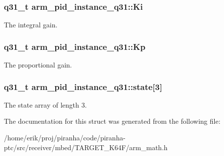 \subsubsection[{\texorpdfstring{Ki}{Ki}}]{\setlength{\rightskip}{0pt plus 5cm}q31\+\_\+t arm\+\_\+pid\+\_\+instance\+\_\+q31\+::\+Ki}\hypertarget{structarm__pid__instance__q31_aa861d69fd398f29aa0b4b455a823ed72}{}\label{structarm__pid__instance__q31_aa861d69fd398f29aa0b4b455a823ed72}
The integral gain. 
\subsubsection[{\texorpdfstring{Kp}{Kp}}]{\setlength{\rightskip}{0pt plus 5cm}q31\+\_\+t arm\+\_\+pid\+\_\+instance\+\_\+q31\+::\+Kp}\hypertarget{structarm__pid__instance__q31_ac2410bf7f856d58dc1d773d4983cac8e}{}\label{structarm__pid__instance__q31_ac2410bf7f856d58dc1d773d4983cac8e}
The proportional gain. 
\subsubsection[{\texorpdfstring{state}{state}}]{\setlength{\rightskip}{0pt plus 5cm}q31\+\_\+t arm\+\_\+pid\+\_\+instance\+\_\+q31\+::state\mbox{[}3\mbox{]}}\hypertarget{structarm__pid__instance__q31_a228e4a64da6014844a0a671a1fa391d4}{}\label{structarm__pid__instance__q31_a228e4a64da6014844a0a671a1fa391d4}
The state array of length 3. 

The documentation for this struct was generated from the following file\+:\begin{DoxyCompactItemize}
\item 
/home/erik/proj/piranha/code/piranha-\/ptc/src/receiver/mbed/\+T\+A\+R\+G\+E\+T\+\_\+\+K64\+F/arm\+\_\+math.\+h\end{DoxyCompactItemize}
